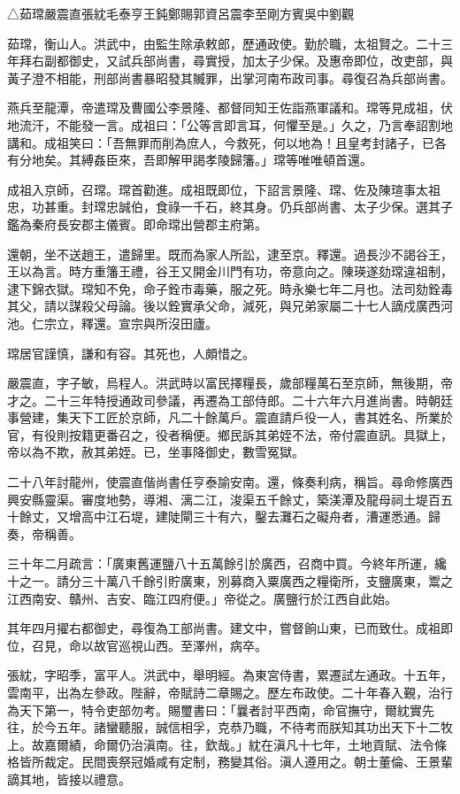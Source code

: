 
\begin{pinyinscope}
△茹瑺嚴震直張紞毛泰亨王鈍鄭賜郭資呂震李至剛方賓吳中劉觀

茹瑺，衡山人。洪武中，由監生除承敕郎，歷通政使。勤於職，太祖賢之。二十三年拜右副都御史，又試兵部尚書，尋實授，加太子少保。及惠帝即位，改吏部，與黃子澄不相能，刑部尚書暴昭發其贓罪，出掌河南布政司事。尋復召為兵部尚書。

燕兵至龍潭，帝遣瑺及曹國公李景隆、都督同知王佐詣燕軍議和。瑺等見成祖，伏地流汗，不能發一言。成祖曰：「公等言即言耳，何懼至是。」久之，乃言奉詔割地講和。成祖笑曰：「吾無罪而削為庶人，今救死，何以地為！且皇考封諸子，已各有分地矣。其縛姦臣來，吾即解甲謁孝陵歸籓。」瑺等唯唯頓首還。

成祖入京師，召瑺。瑺首勸進。成祖既即位，下詔言景隆、瑺、佐及陳瑄事太祖忠，功甚重。封瑺忠誠伯，食祿一千石，終其身。仍兵部尚書、太子少保。選其子鑑為秦府長安郡主儀賓。即命瑺出營郡主府第。

還朝，坐不送趙王，遣歸里。既而為家人所訟，逮至京。釋還。過長沙不謁谷王，王以為言。時方重籓王禮，谷王又開金川門有功，帝意向之。陳瑛遂劾瑺違祖制，逮下錦衣獄。瑺知不免，命子銓市毒藥，服之死。時永樂七年二月也。法司劾銓毒其父，請以謀殺父母論。後以銓實承父命，減死，與兄弟家屬二十七人謫戍廣西河池。仁宗立，釋還。宣宗與所沒田廬。

瑺居官謹慎，謙和有容。其死也，人頗惜之。

嚴震直，字子敏，烏程人。洪武時以富民擇糧長，歲部糧萬石至京師，無後期，帝才之。二十三年特授通政司參議，再遷為工部侍郎。二十六年六月進尚書。時朝廷事營建，集天下工匠於京師，凡二十餘萬戶。震直請戶役一人，書其姓名、所業於官，有役則按籍更番召之，役者稱便。鄉民訴其弟姪不法，帝付震直訊。具獄上，帝以為不欺，赦其弟姪。已，坐事降御史，數雪冤獄。

二十八年討龍州，使震直偕尚書任亨泰諭安南。還，條奏利病，稱旨。尋命修廣西興安縣靈渠。審度地勢，導湘、漓二江，浚渠五千餘丈，築渼潭及龍母祠土堤百五十餘丈，又增高中江石堤，建陡閘三十有六，鑿去灘石之礙舟者，漕運悉通。歸奏，帝稱善。

三十年二月疏言：「廣東舊運鹽八十五萬餘引於廣西，召商中買。今終年所運，纔十之一。請分三十萬八千餘引貯廣東，別募商入粟廣西之糧衛所，支鹽廣東，鬻之江西南安、贛州、吉安、臨江四府便。」帝從之。廣鹽行於江西自此始。

其年四月擢右都御史，尋復為工部尚書。建文中，嘗督餉山東，已而致仕。成祖即位，召見，命以故官巡視山西。至澤州，病卒。

張紞，字昭季，富平人。洪武中，舉明經。為東宮侍書，累遷試左通政。十五年，雲南平，出為左參政。陛辭，帝賦詩二章賜之。歷左布政使。二十年春入覲，治行為天下第一，特令吏部勿考。賜璽書曰：「曩者討平西南，命官撫守，爾紞實先往，於今五年。諸蠻聽服，誠信相孚，克恭乃職，不待考而朕知其功出天下十二牧上。故嘉爾績，命爾仍治滇南。往，欽哉。」紞在滇凡十七年，土地貢賦、法令條格皆所裁定。民間喪祭冠婚咸有定制，務變其俗。滇人遵用之。朝士董倫、王景輩謫其地，皆接以禮意。


\end{pinyinscope}
